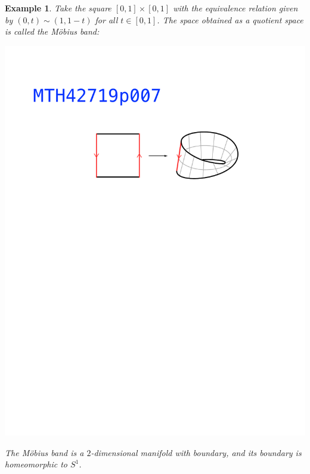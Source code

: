 \documentclass[11pt, letterpaper, oneside]{report}
\theoremstyle{pplain}
\newtheorem{ITERMVALUE THM}[theorem]{Intermediate Value Theorem}
\newtheorem{HEINEBOREL THM}[theorem]{Heine-Borel Theorem}
\newtheorem{UMETR THM}[theorem]{Urysohn Metrization Theorem}
\newtheorem{UMETR2 THM}[theorem]{Urysohn Metrization Theorem (v.2)}
\theoremstyle{ddefinition}
\newtheorem{example}[theorem]{Example}
\theoremstyle{nnn}
\newtheorem{TDA NN}[theorem]{Topological Data Analysis. }
\theoremstyle{eexercise}
\begin{document}
\begin{example}
Take the square $[0,1]\times [0,1]$ with the equivalence relation given by $(0,t)\sim (1, 1-t)$
for all $t\in [0,1]$. The space obtained as a quotient space is called the \emph{M\"obius band}:

{\includegraphics[width=\textwidth, trim=0mm 183mm 0mm 60mm, clip]{pictures/MTH427p007.pdf}}   

The M\"obius band is a $2$-dimensional manifold with boundary, and its boundary is homeomorphic
to $S^{1}$. 
\end{example}
\end{document}
